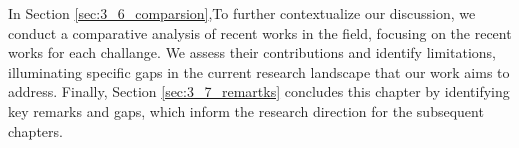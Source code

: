 In Section \ref{sec:3_6_comparsion},To further contextualize our discussion, we conduct a comparative analysis of recent works in the field, focusing on the recent works for each challange. We assess their contributions and identify limitations, illuminating specific gaps in the current research landscape that our work aims to address.
Finally, Section \ref{sec:3_7_remartks} concludes this chapter by identifying key remarks and gaps, which inform the research direction for the subsequent chapters.


